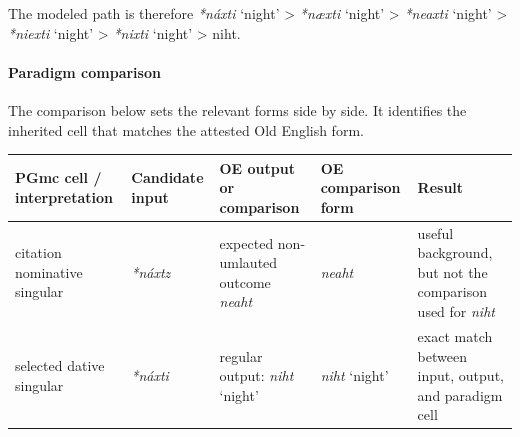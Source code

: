 \documentclass[
  british,
  a4paper,
]{article}
\newcounter{none} %
\providecommand{\Recon}[1]{\emph{*#1}}
\begin{document}
The modeled path is therefore \Recon{náxti} `night' \textgreater{}
\Recon{næxti} `night' \textgreater{} \Recon{neaxti} `night'
\textgreater{} \Recon{niexti} `night' \textgreater{} \Recon{nixti}
`night' \textgreater{} niht.

\paragraph{Paradigm comparison}\label{paradigm-comparison-11}

The comparison below sets the relevant forms side by side. It identifies
the inherited cell that matches the attested Old English form.

{\def\LTcaptype{none} %
\begin{longtable}[]{@{}
  >{\raggedright\arraybackslash}p{}
  >{\raggedright\arraybackslash}p{}
  >{\raggedright\arraybackslash}p{}
  >{\raggedright\arraybackslash}p{}
  >{\raggedright\arraybackslash}p{}@{}}
\toprule\noalign{}
\begin{minipage}[b]{\linewidth}\raggedright
PGmc cell / interpretation
\end{minipage} & \begin{minipage}[b]{\linewidth}\raggedright
Candidate input
\end{minipage} & \begin{minipage}[b]{\linewidth}\raggedright
OE output or comparison
\end{minipage} & \begin{minipage}[b]{\linewidth}\raggedright
OE comparison form
\end{minipage} & \begin{minipage}[b]{\linewidth}\raggedright
Result
\end{minipage} \\
\midrule\noalign{}
\endhead
\bottomrule\noalign{}
\endlastfoot
citation nominative singular & {\emph{*náxtz}} & expected non-umlauted
outcome {\emph{neaht}} & {\emph{neaht}} & useful background, but not the
comparison used for \emph{niht} \\
selected dative singular & {\emph{*náxti}} & regular output:
{\emph{niht}} `night' & {\emph{niht}} `night' & exact match between
input, output, and paradigm cell \\
\end{longtable}
}
\end{document}
